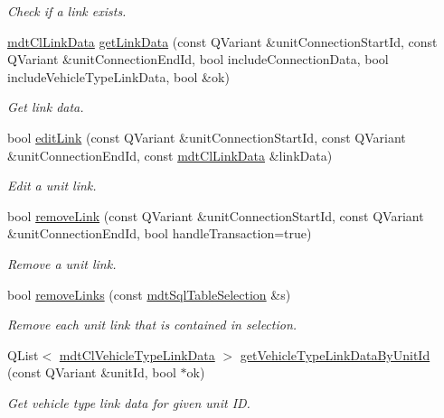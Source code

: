 \begin{DoxyCompactItemize}
\begin{DoxyCompactList}\small\item\em Check if a link exists. \end{DoxyCompactList}\item 
\hyperlink{classmdt_cl_link_data}{mdt\-Cl\-Link\-Data} \hyperlink{classmdt_cl_link_a44813fcef5e881dfffd03275996bf9c7}{get\-Link\-Data} (const Q\-Variant \&unit\-Connection\-Start\-Id, const Q\-Variant \&unit\-Connection\-End\-Id, bool include\-Connection\-Data, bool include\-Vehicle\-Type\-Link\-Data, bool \&ok)
\begin{DoxyCompactList}\small\item\em Get link data. \end{DoxyCompactList}\item 
bool \hyperlink{classmdt_cl_link_a20d0c8888a1674a6977940fcde654f60}{edit\-Link} (const Q\-Variant \&unit\-Connection\-Start\-Id, const Q\-Variant \&unit\-Connection\-End\-Id, const \hyperlink{classmdt_cl_link_data}{mdt\-Cl\-Link\-Data} \&link\-Data)
\begin{DoxyCompactList}\small\item\em Edit a unit link. \end{DoxyCompactList}\item 
bool \hyperlink{classmdt_cl_link_a865c0cee1fab1c9209d139dcd70f9fbd}{remove\-Link} (const Q\-Variant \&unit\-Connection\-Start\-Id, const Q\-Variant \&unit\-Connection\-End\-Id, bool handle\-Transaction=true)
\begin{DoxyCompactList}\small\item\em Remove a unit link. \end{DoxyCompactList}\item 
bool \hyperlink{classmdt_cl_link_a91b55ddf0dd2129b4b0bf499b2916102}{remove\-Links} (const \hyperlink{classmdt_sql_table_selection}{mdt\-Sql\-Table\-Selection} \&s)
\begin{DoxyCompactList}\small\item\em Remove each unit link that is contained in selection. \end{DoxyCompactList}\item 
Q\-List$<$ \hyperlink{classmdt_cl_vehicle_type_link_data}{mdt\-Cl\-Vehicle\-Type\-Link\-Data} $>$ \hyperlink{classmdt_cl_link_ad7c30c7cfae5f38fc38133f550e2dd01}{get\-Vehicle\-Type\-Link\-Data\-By\-Unit\-Id} (const Q\-Variant \&unit\-Id, bool $\ast$ok)
\begin{DoxyCompactList}\small\item\em Get vehicle type link data for given unit I\-D. \end{DoxyCompactList}\item 

\end{DoxyCompactItemize}
